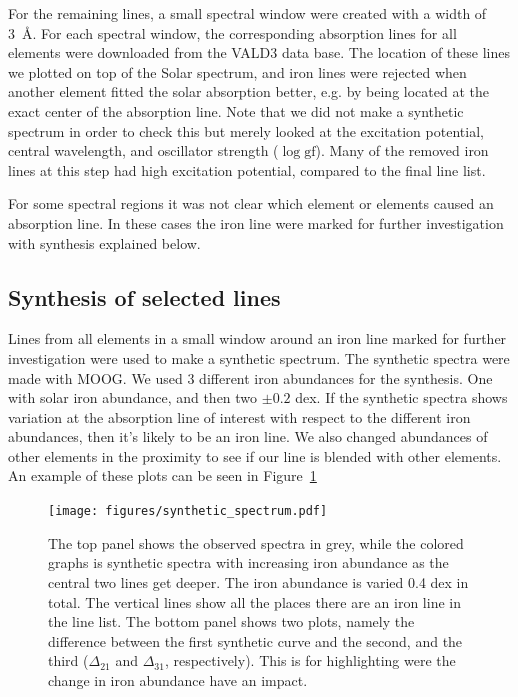 \documentclass{aa}
\begin{document}
For the remaining lines, a small spectral window were created with a
width of \SI{3}{\angstrom}. For each spectral window, the corresponding
absorption lines for all elements were downloaded from the VALD3 data
base. The location of these lines we plotted on top of the Solar
spectrum, and iron lines were rejected when another element fitted the
solar absorption better, e.g. by being located at the exact center of
the absorption line. Note that we did not make a synthetic spectrum
in order to check this but merely looked at the excitation potential,
central wavelength, and oscillator strength ($\log \mathrm{gf}$). Many
of the removed iron lines at this step had high excitation potential,
compared to the final line list.

For some spectral regions it was not clear which element or elements
caused an absorption line. In these cases the iron line were marked for
further investigation with synthesis explained below.



\subsection{Synthesis of selected lines}
\label{sub:synthesis_of_selected_lines}
Lines from all elements in a small window around an iron line marked
for further investigation were used to make a synthetic spectrum.
The synthetic spectra were made with MOOG. We used 3 different iron
abundances for the synthesis. One with solar iron abundance, and
then two $\pm0.2$ dex. If the synthetic spectra shows variation at
the absorption line of interest with respect to the different iron
abundances, then it's likely to be an iron line. We also changed
abundances of other elements in the proximity to see if our line is
blended with other elements. An example of these plots can be seen
in Figure~\ref{fig:synthesis}

\begin{figure}[tpb]
    \centering
    \texttt{[image: figures/synthetic\_spectrum.pdf]}
    \caption{The top panel shows the observed spectra in grey, while
        the colored graphs is synthetic spectra with increasing iron
        abundance as the central two lines get deeper. The iron abundance
        is varied 0.4 dex in total. The vertical lines show all the places
        there are an iron line in the line list. The bottom panel shows
        two plots, namely the difference between the first synthetic curve
        and the second, and the third ($\Delta_{21}$ and $\Delta_{31}$,
        respectively). This is for highlighting were the change in iron
        abundance have an impact.}
    \label{fig:synthesis}
\end{figure}
\end{document}
